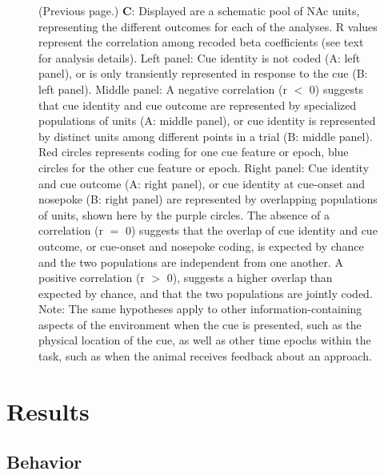 \documentclass[11pt]{article}
\newcommand{\bsf}[1]{\textbf{#1}}
\begin{document}
\addtocounter{figure}{-1}
\begin{figure} [t!]
  \caption{(Previous page.) \bsf{C}: Displayed are a schematic pool of NAc units, representing the different outcomes for each of the analyses. R values represent the correlation among recoded beta coefficients (see text for analysis details). Left panel: Cue identity is not coded (A: left panel), or is only transiently represented in response to the cue (B: left panel). Middle panel: A negative correlation (r $<$ 0) suggests that cue identity and cue outcome are represented by specialized populations of units (A: middle panel), or cue identity is represented by distinct units among different points in a trial (B: middle panel). Red circles represents coding for one cue feature or epoch, blue circles for the other cue feature or epoch. Right panel: Cue identity and cue outcome (A: right panel), or cue identity at cue-onset and nosepoke (B: right panel) are represented by overlapping populations of units, shown here by the purple circles. The absence of a correlation (r $=$ 0) suggests that the overlap of cue identity and cue outcome, or cue-onset and nosepoke coding, is expected by chance and the two populations are independent from one another. A positive correlation (r $>$ 0), suggests a higher overlap than expected by chance, and that the two populations are jointly coded. Note: The same hypotheses apply to other information-containing aspects of the environment when the cue is presented, such as the physical location of the cue, as well as other time epochs within the task, such as when the animal receives feedback about an approach.}%
\end{figure}

\section*{Results}

\subsection*{Behavior}
\end{document}
